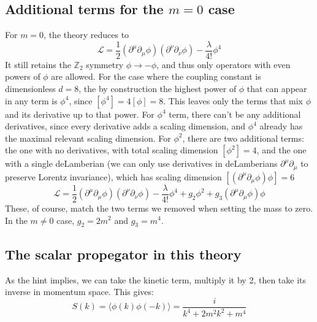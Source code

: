 \documentclass{article}
\begin{document}
\subsection{Additional terms for the $m = 0$ case}
For $m = 0$, the theory reduces to
\begin{equation}
    \mathcal{L} = \frac{1}{2}\left(\partial^\mu\partial_\mu\phi\right)\left(\partial^\nu\partial_\nu\phi\right) - \frac{\lambda}{4!}\phi^4
\end{equation}
It still retains the $\mathbb{Z}_2$ symmetry $\phi \rightarrow -\phi$, and thus only operators with even powers of $\phi$ are allowed. For the case where the coupling constant is dimensionless $d = 8$, the by construction the highest power of $\phi$ that can appear in any term is $\phi^4$, since $\left[\phi^4\right] = 4[\phi] = 8$. This leaves only the terms that mix $\phi$ and its derivative up to that power.
\newline
For $\phi^4$ term, there can't be any additional derivatives, since every derivative adds a scaling dimension, and $\phi^4$ already has the maximal relevant scaling dimension. For $\phi^2$, there are two additional terms: the one with no derivatives, with total scaling dimension $[\phi^2] = 4$, and the one with a single deLamberian (we can only use derivatives in deLamberians $\partial^\mu\partial_\mu$ to preserve Lorentz invariance), which has scaling dimension $\left[\left(\partial^\mu\partial_\mu\phi\right)\phi\right] = 6$
\begin{equation}
    \mathcal{L} = \frac{1}{2}\left(\partial^\mu\partial_\mu\phi\right)\left(\partial^\nu\partial_\nu\phi\right) - \frac{\lambda}{4!}\phi^4 + g_2 \phi^2 + g_3 \left(\partial^\mu\partial_\mu\phi\right)\phi
\end{equation}
These, of course, match the two terms we removed when setting the mass to zero. In the $m \ne 0$ case, $g_2 = 2m^2$ and $g_3 = m^4$.
\subsection{The scalar propegator in this theory}
As the hint implies, we can take the kinetic term, multiply it by 2, then take its inverse in momentum space. This gives:
\begin{equation}
    S(k) = \langle \phi(k) \phi(-k) \rangle = \frac{i}{k^4 + 2m^2k^2 + m^4}
\end{equation}
\end{document}
